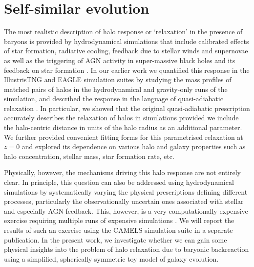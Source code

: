 \section{Self-similar evolution}
The most realistic description of halo response or `relaxation' in the presence of baryons is provided by hydrodynamical simulations that include calibrated effects of star formation, radiative cooling, feedback due to stellar winds and supernovae as well as the triggering of AGN activity in super-massive black holes and its feedback on star formation \cite{2015Schaye_EAGLE,2018TNG_Pillepich_etal}. 
In our earlier work \cite{2023Velmani&Paranjape} we quantified this response in the IllustrisTNG \cite{2018TNG_Pillepich_etal}
and EAGLE \cite{2015Schaye_EAGLE} %
simulation suites by studying the mass profiles of matched pairs of halos in the hydrodynamical and gravity-only runs of the simulation, and described the response in the language of quasi-adiabatic relaxation \cite{2011TeyssierMMDM}. %
In particular, we showed that the original quasi-adiabatic prescription accurately describes the relaxation of halos in simulations provided we include the halo-centric distance in units of the halo radius as an additional parameter. We further provided convenient fitting forms for this parametrised relaxation at $z=0$ and explored its dependence on various halo and galaxy properties such as halo concentration, stellar mass, star formation rate, etc.

Physically, however, the mechanisms driving this halo response are not entirely clear. In principle, this question can also be addressed using hydrodynamical simulations by systematically varying the physical prescriptions defining different processes, particularly the observationally uncertain ones associated with stellar and especially AGN feedback. This, however, is a very computationally expensive exercise requiring multiple runs of expensive simulations \cite{2015Schaye_EAGLE,2021camels_presentation}.
We will report the results of such an exercise using the CAMELS simulation suite \cite{2022camels_data_release1} in a separate publication. In the present work, we investigate whether we can gain some physical insights into the problem of halo relaxation due to baryonic backreaction using a simplified, spherically symmetric toy model of galaxy evolution.

